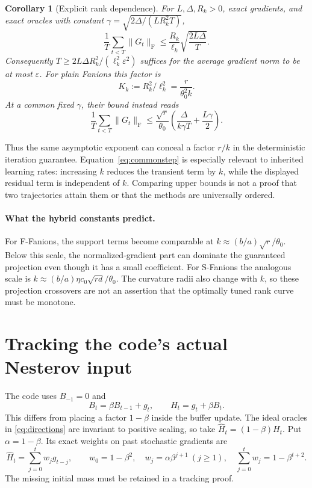 \documentclass[11pt]{article}
\newtheorem{corollary}[theorem]{Corollary}
\newcommand{\F}[1]{\lVert #1\rVert_{\mathrm F}}
\begin{document}
\begin{corollary}[Explicit rank dependence]\label{cor:rates}
For $L,\Delta,R_k>0$, exact gradients, and exact oracles with constant
$\gamma=\sqrt{2\Delta/(LR_k^2T)}$,
\begin{equation}\label{eq:deterministic}
 \frac1T\sum_{t<T}\F{G_t}
 \leq\frac{R_k}{\ell_k}\sqrt{\frac{2L\Delta}{T}}.
\end{equation}
Consequently $T\geq2L\Delta R_k^2/(\ell_k^2\varepsilon^2)$ suffices
for the average gradient norm to be at most $\varepsilon$.
For plain Fanions this factor is
\[
 K_k:=R_k^2/\ell_k^2=\frac{r}{\theta_0^2k}.
\]
At a common fixed $\gamma$, their bound instead reads
\begin{equation}\label{eq:commonstep}
 \frac1T\sum_{t<T}\F{G_t}
 \leq\frac{\sqrt r}{\theta_0}
       \left(\frac{\Delta}{k\gamma T}+\frac{L\gamma}{2}\right).
\end{equation}
\end{corollary}

Thus the same asymptotic exponent can conceal a factor $r/k$ in the
deterministic iteration guarantee. Equation~\eqref{eq:commonstep} is
especially relevant to inherited learning rates: increasing $k$ reduces the
transient term by $k$, while the displayed residual term is independent of
$k$. Comparing upper bounds is not a proof that two trajectories attain
them or that the methods are universally ordered.

\paragraph{What the hybrid constants predict.}
For F-Fanions, the support terms become comparable at
$k\approx(b/a)\sqrt r/\theta_0$. Below this scale, the normalized-gradient
part can dominate the guaranteed projection even though it has a small
coefficient. For S-Fanions the analogous scale is
$k\approx(b/a)\eta c_0\sqrt{rd}/\theta_0$.
The curvature radii also change with $k$, so these projection crossovers are
not an assertion that the optimally tuned rank curve must be monotone.

\section{Tracking the code's actual Nesterov input}\label{sec:nesterov}

The code uses $B_{-1}=0$ and
\[
 B_t=\beta B_{t-1}+g_t,\qquad H_t=g_t+\beta B_t.
\]
This differs from placing a factor $1-\beta$ inside the buffer update.
The ideal oracles in \eqref{eq:directions} are invariant to positive scaling,
so take $\widehat H_t=(1-\beta)H_t$. Put $\alpha=1-\beta$. Its exact weights
on past stochastic gradients are
\begin{equation}\label{eq:weights}
 \widehat H_t=\sum_{j=0}^t w_jg_{t-j},\qquad
 w_0=1-\beta^2,\quad w_j=\alpha\beta^{j+1}\ (j\geq1),\quad
 \sum_{j=0}^t w_j=1-\beta^{t+2}.
\end{equation}
The missing initial mass must be retained in a tracking proof.
\end{document}
